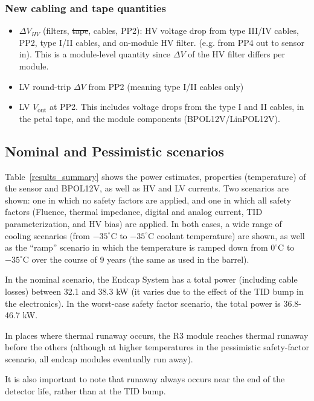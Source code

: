 \subsubsection{New cabling and tape quantities}

\begin{itemize}
\setlength\itemsep{0.0em}
\item $\Delta V_{HV}$ (filters, \sout{tape}, cables, PP2): HV voltage drop from type
III/IV cables, PP2, type I/II cables, and on-module HV filter. (e.g. from PP4 out to sensor in).
This is a module-level quantity since $\Delta V$ of the HV filter differs per module.
\item LV round-trip $\Delta V$ from PP2 (meaning type I/II cables only)
\item LV $V_\text{out}$ at PP2. This includes voltage drops from the type I and II cables, in the
  petal tape, and the module components (BPOL12V/LinPOL12V).
\end{itemize}

\subsection{Nominal and Pessimistic scenarios}

Table~\ref{results_summary} shows the power estimates, properties (temperature) of the sensor and
BPOL12V, as well as HV and LV currents. Two scenarios are shown: one in which no safety factors are
applied, and one in which all safety factors (Fluence, thermal impedance, digital and analog current,
TID parameterization, and HV bias) are applied. In both cases, a wide range of cooling scenarios
(from $-35^\circ$C to $-35^\circ$C coolant temperature) are shown, as well as the ``ramp'' scenario
in which the temperature is ramped down from $0^\circ$C to $-35^\circ$C over the course of 9 years
(the same as used in the barrel).

In the nominal scenario, the Endcap System has a total power (including cable losses) between 32.1
and 38.3 kW (it varies due to the effect of the TID bump in the electronics).
In the worst-case safety factor scenario, the total power is 36.8-46.7 kW.

In places where thermal runaway occurs, the R3 module reaches thermal runaway before the others
(although at higher temperatures in the pessimistic safety-factor scenario, all endcap modules
eventually run away).

It is also important to note that runaway always occurs near the end of the detector life, rather than
at the TID bump.

